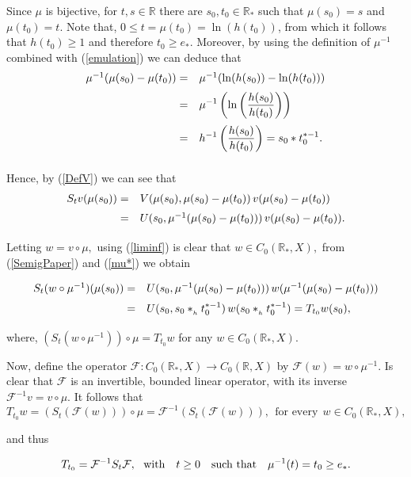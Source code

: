 \documentclass[10pt]{amsart}
\numberwithin{equation}{section}
\begin{document}
Since $\mu$ is bijective, for $t, s \in \mathbb{R}$ there are $s_0, t_0 \in \mathbb{R}_*$ such that $\mu(s_0) = s$ and $\mu(t_0) = t$. Note that, $0 \le t = \mu(t_0) = \ln(h(t_0))$, 
from which it follows that $ h(t_0) \ge 1$ and therefore $t_0 \ge e_*.$ Moreover, by using the definition of $\mu^{-1}$ combined with (\ref{emulation}) we can deduce that
\begin{equation}\label{mu*}
\begin{array}{rl}
\medskip
    \mu^{-1}(\mu(s_0) - \mu(t_0)) = & \mu^{-1}(\ln(h(s_0)) - \ln(h(t_0))) \\
    \medskip
    = & \displaystyle \mu^{-1}\left(\ln\left(\frac{h(s_0)}{h(t_0)}\right)\right) \\
    \medskip
    = & \displaystyle  h^{-1}\left(\frac{h(s_0)}{h(t_0)}\right) = s_0*t_0^{*-1}.
    \end{array}
\end{equation}

Hence, by (\ref{DefV}) we can see that
$$
\begin{array}{rl}
\medskip
S_tv(\mu(s_0)) = & V(\mu(s_0), \mu(s_0) - \mu(t_0)) \, v(\mu(s_0)-\mu(t_0)) \\
\medskip
= & U(s_0, \mu^{-1}(\mu(s_0) - \mu(t_0))) \, v(\mu(s_0)-\mu(t_0)).
\end{array}
$$
Letting $w = v \circ \mu,$ using (\ref{liminf}) is clear that $w \in C_0(\mathbb{R}_*, X),$ from (\ref{SemigPaper}) and (\ref{mu*}) we obtain

$$
\begin{array}{rl}
\medskip
S_t(w \circ \mu^{-1})(\mu(s_0)) = & U(s_0, \mu^{-1}(\mu(s_0) - \mu(t_0))) \, w(\mu^{-1}(\mu(s_0)-\mu(t_0))) \\
\medskip
= & U(s_0, s_0*_{_h}t_0^{*-1}) \, w(s_0*_{_h} t_0^{*-1}) = T_{t_0} w(s_0),
\end{array}
$$
where, $(S_t(w\circ \mu^{-1})) \circ \mu = T_{t_0}w$ for any $w \in C_0(\mathbb{R}_*, X).$

\medskip 

Now, define the operator $\mathcal{F}: C_0(\mathbb{R}_*, X)  \to C_0(\mathbb{R}, X)$ by $\mathcal{F}(w) = w \circ \mu^{-1}.$ Is clear that $\mathcal{F}$ is an invertible, bounded linear operator, with its inverse $\mathcal{F}^{-1}v = v \circ \mu.$ It follows that
$$
T_{t_0}w = (S_t(\mathcal{F}(w))) \circ \mu = \mathcal{F}^{-1} (S_t(\mathcal{F}(w))), \ \ \mbox{for every} \ \ w \in C_0(\mathbb{R}_*, X),$$

\noindent and thus 

\begin{equation}
\label{SimSem}
T_{t_0} = \mathcal{F}^{-1} S_t \mathcal{F},  \ \ \mbox{with} \quad  t \ge 0 \quad \textnormal{such that} \quad \mu^{-1}(t) = t_0 \ge e_*.    
\end{equation}
\end{document}
